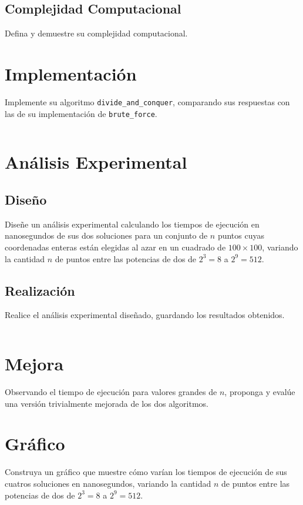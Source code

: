 \documentclass{article}
\begin{document}
\subsection{Complejidad Computacional}
Defina y demuestre su complejidad computacional.



\section{Implementación}

Implemente su algoritmo \texttt{divide\_and\_conquer}, comparando sus respuestas con las de su implementación de \texttt{brute\_force}.

\begin{lstlisting}
\end{lstlisting}


\section{Análisis Experimental}

\subsection{Diseño}

Diseñe un análisis experimental calculando los tiempos de ejecución en nanosegundos de sus dos soluciones para un conjunto de $n$ puntos cuyas coordenadas enteras están elegidas al azar en un cuadrado de $100\times100$, variando la cantidad $n$ de puntos entre las potencias de dos de $2^3=8$ a $2^{9}=512$.

\subsection{Realización}

Realice el análisis experimental diseñado, guardando los resultados obtenidos.


\begin{lstlisting}
\end{lstlisting}

\section{Mejora} Observando el tiempo de ejecución para valores grandes de $n$, proponga y evalúe una versión trivialmente mejorada de los dos algoritmos.


\section{Gráfico} Construya un gráfico que muestre cómo varían los tiempos de ejecución de sus cuatros soluciones en nanosegundos, variando la cantidad $n$ de puntos entre las potencias de dos de $2^3=8$ a $2^9=512$.

\end{document}
